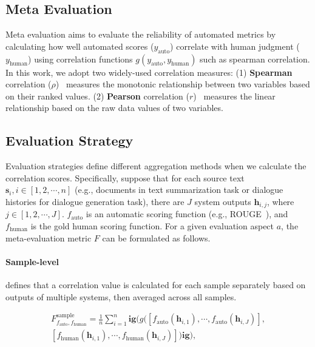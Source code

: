 \subsection{Meta Evaluation} Meta evaluation aims to evaluate the reliability of automated metrics by calculating how well automated scores ($y_{\text{auto}}$) correlate with human judgment ($y_{\text{human}}$) using correlation functions $g(y_{\text{auto}}, y_{\text{human}})$ such as spearman correlation. In this work, we adopt two widely-used correlation measures: (1) \textbf{Spearman} correlation ($\rho$)~\cite{zar2005spearman} measures the monotonic relationship between two variables based on their ranked values. (2) \textbf{Pearson} correlation ($r$)~\cite{mukaka2012guide} measures the linear relationship based on the raw data values of two variables. 

\subsection{Evaluation Strategy} Evaluation strategies define different aggregation methods when we calculate the correlation scores. Specifically, suppose that for each source text $\bm{s}_{i}, i \in [1, 2, \cdots, n]$ (e.g., documents in text summarization task or dialogue histories for dialogue generation task), there are $J$ system outputs $\bm{h}_{i,j}$, where $j \in [1, 2, \cdots, J]$. 
$f_{\text{auto}}$ is an automatic scoring function (e.g., ROUGE~\cite{rouge2004lin}), and $f_{\text{human}}$ is the gold human scoring function. For a given evaluation aspect $a$, the meta-evaluation metric $F$ can be formulated as follows.

\paragraph{Sample-level} defines that a correlation value is calculated for each sample separately based on outputs of multiple systems, then averaged across all samples.

\begin{equation*}
\begin{split}
    F^{\text{sample}}_{f_{\text{auto}}, f_{\text{human}}} = \frac{1}{n} \sum\limits_{i=1}^{n} 
    \mathbf{ig}(g\big(
    \left[f_{\text{auto}}(\bm{h}_{i,1}), \cdots, f_{\text{auto}}(\bm{h}_{i,J}) \right], \\
    \left[f_{\text{human}}(\bm{h}_{i,1}), \cdots, f_{\text{human}}(\bm{h}_{i,J}) \right]
    \big) \mathbf{ig}),
\end{split}
\end{equation*}


